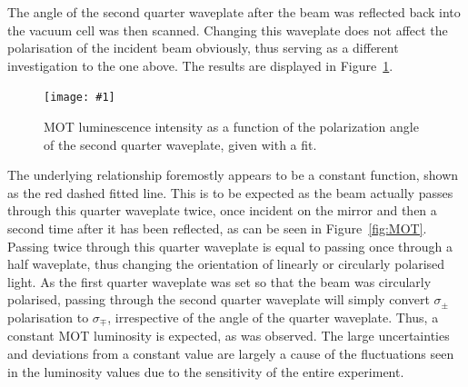 \documentclass[twocolumn]{article}
\newcommand{\insertFigure}[1]{%
   \texttt{[image: \#1]}%
}
\begin{document}
\par The angle of the second quarter waveplate after the beam was reflected back into the vacuum cell was then scanned. Changing this waveplate does not affect the polarisation of the incident beam obviously, thus serving as a different investigation to the one above. The results are displayed in Figure~\ref{fig:Waveplate2}.
\begin{figure} [!h]
	\centering
	\insertFigure{Images/Waveplate2.png}
	\caption{MOT luminescence intensity as a function of the polarization angle of the second quarter waveplate, given with a fit.}
	\label{fig:Waveplate2}
\end{figure}
The underlying relationship foremostly appears to be a constant function, shown as the red dashed fitted line. This is to be expected as the beam actually passes through this quarter waveplate twice, once incident on the mirror and then a second time after it has been reflected, as can be seen in Figure~\ref{fig:MOT}. Passing twice through this quarter waveplate is equal to passing once through a half waveplate, thus changing the orientation of linearly or circularly polarised light. As the first quarter waveplate was set so that the beam was circularly polarised, passing through the second quarter waveplate will simply convert $\sigma_\pm$ polarisation to $\sigma_\mp$, irrespective of the angle of the quarter waveplate. Thus, a constant MOT luminosity is expected, as was observed. The large uncertainties and deviations from a constant value are largely a cause of the fluctuations seen in the luminosity values due to the sensitivity of the entire experiment.
\end{document}
